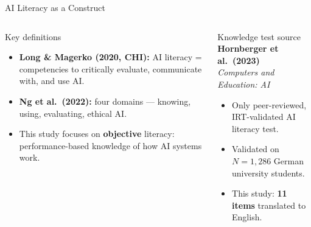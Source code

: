 \documentclass[10pt,aspectratio=169]{beamer}
\begin{document}
\begin{frame}{AI Literacy as a Construct}
  \begin{columns}[T]
    \begin{block}{Key definitions}
      \begin{itemize}
        \item \textbf{Long \& Magerko (2020, CHI):} AI literacy = competencies
              to critically evaluate, communicate with, and use AI.
        \item \textbf{Ng et al.\ (2022):} four domains --- knowing, using,
              evaluating, ethical AI.
        \item This study focuses on \textbf{objective} literacy:
              performance-based knowledge of how AI systems work.
      \end{itemize}
    \end{block}
    \begin{block}{Knowledge test source}
      \textbf{Hornberger et al.\ (2023)}\\
      \emph{Computers and Education: AI}
      \begin{itemize}
        \item Only peer-reviewed, IRT-validated AI literacy test.
        \item Validated on $N = 1{,}286$ German university students.
        \item This study: \textbf{11 items} translated to English.
      \end{itemize}
    \end{block}
  \end{columns}
\end{frame}
\end{document}
